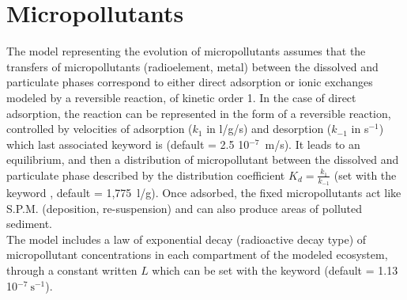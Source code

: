 \section{Micropollutants}

The model representing the evolution of micropollutants assumes
that the transfers of micropollutants (radioelement, metal)
between the dissolved and particulate phases correspond to either
direct adsorption or ionic exchanges modeled by a reversible reaction,
of kinetic order 1.
In the case of direct adsorption, the reaction can be represented in the form of
a reversible reaction, controlled by velocities of adsorption ($k_1$ in l/g/s)
and desorption ($k_{-1}$ in s$^{-1}$)
which last associated keyword is 
(default = 2.5 10$^{-7}$~m/s).
It leads to an equilibrium, and then a distribution of micropollutant
between the dissolved and particulate phase described
by the distribution coefficient $K_d = \frac{k_1}{k_{-1}}$
(set with the keyword
, default = 1,775~l/g).
Once adsorbed, the fixed micropollutants act like S.P.M. (deposition, re-suspension)
and can also produce areas of polluted sediment.\\

The model includes a law of exponential decay (radioactive decay type) of micropollutant
concentrations in each compartment of the modeled ecosystem,
through a constant written $L$
which can be set with the keyword
 (default = 1.13 10$^{-7}~\textrm{s}^{-1}$).
